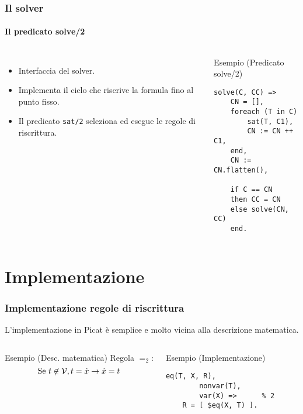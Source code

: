 \documentclass{beamer}
\begin{document}

\begin{frame}[fragile]
  \frametitle{Il solver}
  \framesubtitle{Il predicato solve/2}
  
  \begin{columns}[c]
    \begin{itemize}
    \item Interfaccia del solver.
    \item Implementa il ciclo che riscrive la formula fino al punto fisso.
    \item Il predicato \texttt{sat/2} seleziona ed esegue le regole di riscrittura.
    \end{itemize}

    \begin{exampleblock}{Esempio (Predicato solve/2)}
\begin{verbatim}
solve(C, CC) =>
    CN = [],
    foreach (T in C)
        sat(T, C1),
        CN := CN ++ C1,
    end,
    CN := CN.flatten(),
    
    if C == CN
    then CC = CN
    else solve(CN, CC)
    end.
\end{verbatim}
    \end{exampleblock}	
  \end{columns}
\end{frame}

\section{Implementazione}


\begin{frame}[fragile]
  \frametitle{Implementazione regole di riscrittura} L'implementazione
  in Picat è semplice e molto vicina alla descrizione matematica.
  \begin{columns}[c]
    \begin{exampleblock}{Esempio (Desc. matematica)}
      Regola $=_2$:
      \[
      \text{Se }t \not\in \mathcal{V}, t = \dot{x} \to \dot{x} = t
      \]
    \end{exampleblock}
    
    \begin{exampleblock}{Esempio (Implementazione)}
\begin{verbatim}
eq(T, X, R), 
        nonvar(T),
        var(X) =>      % 2
    R = [ $eq(X, T) ].
\end{verbatim}
    \end{exampleblock}
  \end{columns}
\end{frame}
\end{document}
